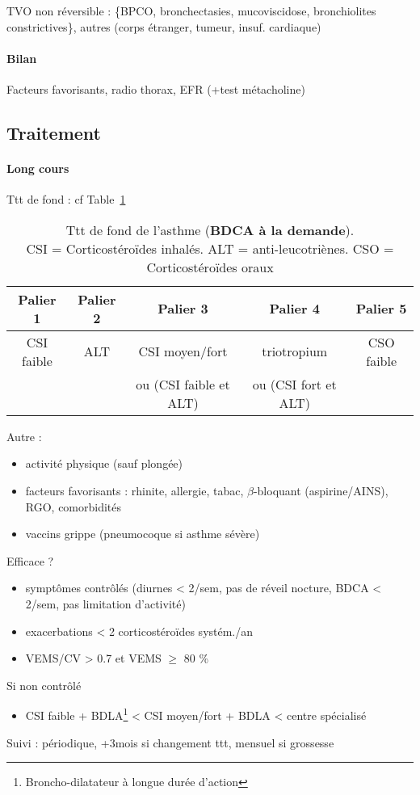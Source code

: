 TVO non réversible : \{BPCO, bronchectasies, mucoviscidose, bronchiolites
constrictives\}, autres (corps étranger, tumeur, insuf. cardiaque)
\paragraph{Bilan}
Facteurs favorisants, radio thorax, EFR (+test métacholine)

\subsection{Traitement}

\paragraph{Long cours}
Ttt de fond : cf Table~\ref{tab:ttt_asthme}

\begin{table}
  \centering
  \begin{tabular}{ccccc}
    \toprule
    Palier 1 & Palier 2 & Palier 3 & Palier 4 & Palier 5 \\
    \midrule
    CSI faible & ALT & CSI moyen/fort & triotropium & CSO faible\\
             & & ou (CSI faible et ALT) & ou (CSI fort et ALT) &\\
  \bottomrule                                                              
  \end{tabular}
  \caption{Ttt de fond de l'asthme (\textbf{BDCA à la demande}).\\
    CSI = Corticostéroïdes inhalés. ALT =
    anti-leucotriènes. CSO = Corticostéroïdes oraux}
  \label{tab:ttt_asthme}
\end{table}

Autre : 
\begin{itemize}
\item activité physique (sauf plongée)
\item facteurs favorisants : rhinite, allergie, tabac, \(\beta\)-bloquant
  (aspirine/AINS), RGO, comorbidités
\item vaccins grippe (pneumocoque si asthme sévère)
\end{itemize}
Efficace ?
\begin{itemize}
\item symptômes contrôlés (diurnes < 2/sem, pas de réveil nocture, BDCA < 2/sem, pas
  limitation d'activité)
\item exacerbations < 2 corticostéroïdes systém./an
\item VEMS/CV > 0.7 et VEMS \(\ge\) 80 \%
\end{itemize}
Si non contrôlé
\begin{itemize}
\item CSI faible + BDLA\footnote{Broncho-dilatateur à longue durée d'action} < CSI
  moyen/fort + BDLA < centre spécialisé
\end{itemize}
Suivi : périodique, +3mois si changement ttt, mensuel si grossesse

